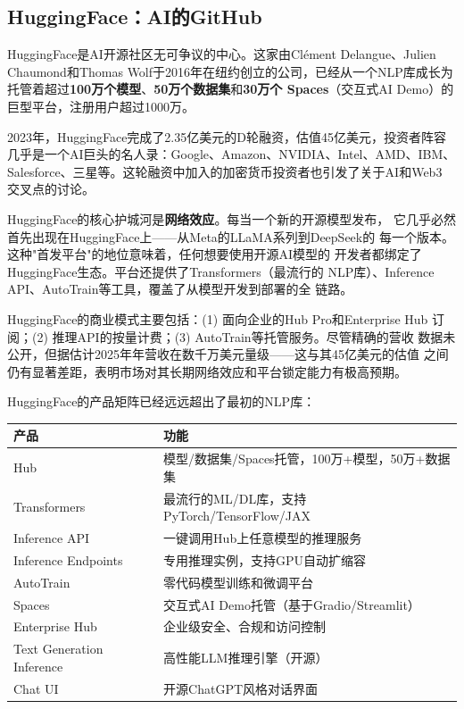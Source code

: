 \subsection{HuggingFace：AI的GitHub}
\label{subsec:huggingface}

HuggingFace是AI开源社区无可争议的中心。这家由Clément Delangue、Julien
Chaumond和Thomas Wolf于2016年在纽约创立的公司，已经从一个NLP库成长为
托管着超过\textbf{100万个模型}、\textbf{50万个数据集}和\textbf{30万个
Spaces}（交互式AI Demo）的巨型平台，注册用户超过1000万。

2023年，HuggingFace完成了2.35亿美元的D轮融资，估值45亿美元，投资者阵容
几乎是一个AI巨头的名人录：Google、Amazon、NVIDIA、Intel、AMD、IBM、
Salesforce、三星等。这轮融资中加入的加密货币投资者也引发了关于AI和Web3
交叉点的讨论。

HuggingFace的核心护城河是\textbf{网络效应}。每当一个新的开源模型发布，
它几乎必然首先出现在HuggingFace上——从Meta的LLaMA系列到DeepSeek的
每一个版本。这种"首发平台"的地位意味着，任何想要使用开源AI模型的
开发者都绑定了HuggingFace生态。平台还提供了Transformers（最流行的
NLP库）、Inference API、AutoTrain等工具，覆盖了从模型开发到部署的全
链路。

HuggingFace的商业模式主要包括：(1) 面向企业的Hub Pro和Enterprise Hub
订阅；(2) 推理API的按量计费；(3) AutoTrain等托管服务。尽管精确的营收
数据未公开，但据估计2025年年营收在数千万美元量级——这与其45亿美元的估值
之间仍有显著差距，表明市场对其长期网络效应和平台锁定能力有极高预期。

HuggingFace的产品矩阵已经远远超出了最初的NLP库：

\begin{keybox}
\small
\begin{tabularx}{\textwidth}{l X}
\toprule
\rowcolor{figLightGray}
\textbf{产品} & \textbf{功能} \\
\midrule
Hub            & 模型/数据集/Spaces托管，100万+模型，50万+数据集 \\
Transformers   & 最流行的ML/DL库，支持PyTorch/TensorFlow/JAX \\
Inference API  & 一键调用Hub上任意模型的推理服务 \\
Inference Endpoints & 专用推理实例，支持GPU自动扩缩容 \\
AutoTrain      & 零代码模型训练和微调平台 \\
Spaces         & 交互式AI Demo托管（基于Gradio/Streamlit） \\
Enterprise Hub & 企业级安全、合规和访问控制 \\
Text Generation Inference & 高性能LLM推理引擎（开源） \\
Chat UI        & 开源ChatGPT风格对话界面 \\
\bottomrule
\end{tabularx}
\end{keybox}

